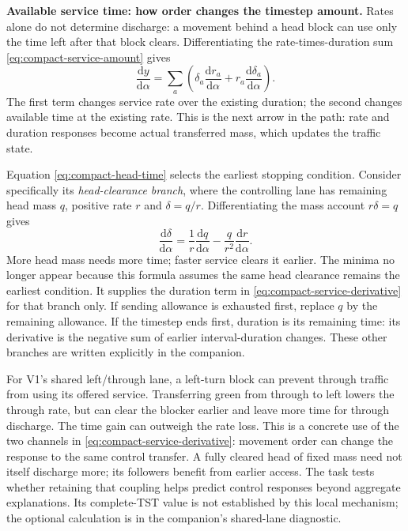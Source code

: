 \documentclass[10pt,a4paper]{article}
\newcommand{\rev}[1]{{\color{revisionred}#1}}
\begin{document}
\textbf{\rev{Available service time: how order changes the timestep amount.}}
Rates alone do not determine discharge: a movement behind a head block
can use only the time left after that block clears. Differentiating the
rate-times-duration sum \rev{\eqref{eq:compact-service-amount}} gives
\begin{equation}
 \frac{\mathrm dy}{\mathrm d\alpha}
 =\sum_a\left(\delta_a\frac{\mathrm dr_a}{\mathrm d\alpha}
              +r_a\frac{\mathrm d\delta_a}{\mathrm d\alpha}\right).
 \label{eq:compact-service-derivative}
\end{equation}
The first term changes service rate over the existing duration; the
second changes available time at the existing rate. This is the next
arrow in the path: \rev{rate and duration responses become actual transferred
mass}, which updates the traffic state.

Equation \rev{\eqref{eq:compact-head-time}} selects the earliest stopping
condition. Consider specifically its \rev{\emph{head-clearance branch}}, where
the controlling lane has remaining head mass $q$, positive rate $r$ and
\rev{$\delta=q/r$}. Differentiating the mass account $r\delta=q$ gives
\begin{equation}
 \frac{\mathrm d\delta}{\mathrm d\alpha}
 =\frac1r\frac{\mathrm dq}{\mathrm d\alpha}
      -\frac q{r^2}\frac{\mathrm dr}{\mathrm d\alpha}.
 \label{eq:compact-head-time-derivative}
\end{equation}
More head mass needs more time; faster service clears it earlier.
The minima no longer appear because this formula assumes the same head
clearance remains the earliest condition. It supplies the duration term
in \rev{\eqref{eq:compact-service-derivative}} \rev{for that branch only}.
If sending allowance is exhausted first, replace $q$ by the remaining
allowance. If the timestep ends first, duration is its remaining time:
its derivative is the negative sum of earlier interval-duration changes.
These other branches are written explicitly in the companion.

For V1's shared left/through lane, a left-turn block can prevent through
traffic from using its offered service. Transferring green from through
to left lowers the through rate, but can clear the blocker earlier and
leave more time for through discharge. \rev{The time gain can outweigh the
rate loss.} This is a concrete use of the two channels in
\rev{\eqref{eq:compact-service-derivative}}: movement order can change the
response to the same control transfer. A fully cleared head of fixed
mass need not itself discharge more; \rev{its followers benefit from earlier
access}. The task tests whether retaining that coupling helps predict
control responses beyond aggregate explanations. Its complete-TST value
is not established by this local mechanism; the optional calculation is
in the companion's shared-lane diagnostic.
\end{document}
